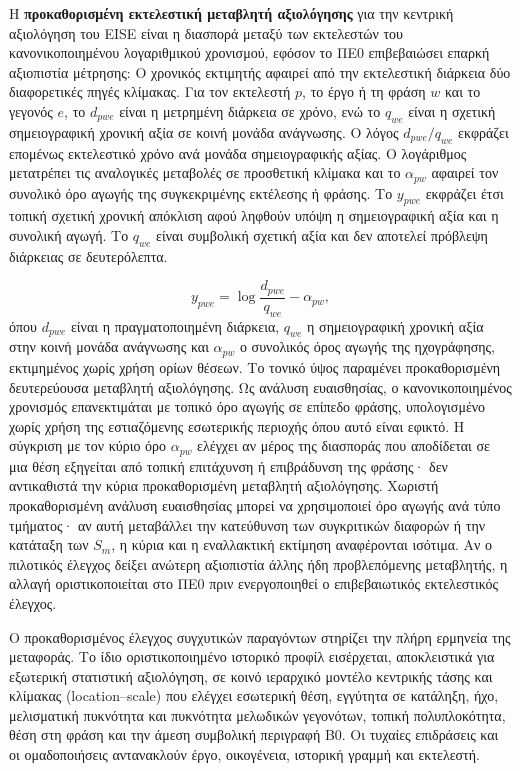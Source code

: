 \documentclass[11pt,a4paper]{article}
\begin{document}
Η \textbf{προκαθορισμένη εκτελεστική μεταβλητή αξιολόγησης} για την κεντρική αξιολόγηση του EISE είναι η διασπορά μεταξύ των εκτελεστών του κανονικοποιημένου λογαριθμικού χρονισμού, εφόσον το ΠΕ0 επιβεβαιώσει επαρκή αξιοπιστία μέτρησης:
Ο χρονικός εκτιμητής αφαιρεί από την εκτελεστική διάρκεια δύο διαφορετικές πηγές κλίμακας. Για τον εκτελεστή $p$, το έργο ή τη φράση $w$ και το γεγονός $e$, το $d_{pwe}$ είναι η μετρημένη διάρκεια σε χρόνο, ενώ το $q_{we}$ είναι η σχετική σημειογραφική χρονική αξία σε κοινή μονάδα ανάγνωσης. Ο λόγος $d_{pwe}/q_{we}$ εκφράζει επομένως εκτελεστικό χρόνο ανά μονάδα σημειογραφικής αξίας. Ο λογάριθμος μετατρέπει τις αναλογικές μεταβολές σε προσθετική κλίμακα και το $\alpha_{pw}$ αφαιρεί τον συνολικό όρο αγωγής της συγκεκριμένης εκτέλεσης ή φράσης. Το $y_{pwe}$ εκφράζει έτσι τοπική σχετική χρονική απόκλιση αφού ληφθούν υπόψη η σημειογραφική αξία και η συνολική αγωγή. Το $q_{we}$ είναι συμβολική σχετική αξία και δεν αποτελεί πρόβλεψη διάρκειας σε δευτερόλεπτα.

\[
y_{pwe}=\log\!\frac{d_{pwe}}{q_{we}}-\alpha_{pw},
\]
όπου $d_{pwe}$ είναι η πραγματοποιημένη διάρκεια, $q_{we}$ η σημειογραφική χρονική αξία στην κοινή μονάδα ανάγνωσης και $\alpha_{pw}$ ο συνολικός όρος αγωγής της ηχογράφησης, εκτιμημένος χωρίς χρήση ορίων θέσεων. Το τονικό ύψος παραμένει προκαθορισμένη δευτερεύουσα μεταβλητή αξιολόγησης. Ως ανάλυση ευαισθησίας, ο κανονικοποιημένος χρονισμός επανεκτιμάται με τοπικό όρο αγωγής σε επίπεδο φράσης, υπολογισμένο χωρίς χρήση της εστιαζόμενης εσωτερικής περιοχής όπου αυτό είναι εφικτό. Η σύγκριση με τον κύριο όρο $\alpha_{pw}$ ελέγχει αν μέρος της διασποράς που αποδίδεται σε μια θέση εξηγείται από τοπική επιτάχυνση ή επιβράδυνση της φράσης· δεν αντικαθιστά την κύρια προκαθορισμένη μεταβλητή αξιολόγησης. Χωριστή προκαθορισμένη ανάλυση ευαισθησίας μπορεί να χρησιμοποιεί όρο αγωγής ανά τύπο τμήματος· αν αυτή μεταβάλλει την κατεύθυνση των συγκριτικών διαφορών ή την κατάταξη των $S_m$, η κύρια και η εναλλακτική εκτίμηση αναφέρονται ισότιμα. Αν ο πιλοτικός έλεγχος δείξει ανώτερη αξιοπιστία άλλης ήδη προβλεπόμενης μεταβλητής, η αλλαγή οριστικοποιείται στο ΠΕ0 πριν ενεργοποιηθεί ο επιβεβαιωτικός εκτελεστικός έλεγχος.

Ο προκαθορισμένος έλεγχος συγχυτικών παραγόντων στηρίζει την πλήρη ερμηνεία της μεταφοράς. Το ίδιο οριστικοποιημένο ιστορικό προφίλ εισέρχεται, αποκλειστικά για εξωτερική στατιστική αξιολόγηση, σε κοινό ιεραρχικό μοντέλο κεντρικής τάσης και κλίμακας (location--scale) που ελέγχει εσωτερική θέση, εγγύτητα σε κατάληξη, ήχο, μελισματική πυκνότητα και πυκνότητα μελωδικών γεγονότων, τοπική πολυπλοκότητα, θέση στη φράση και την άμεση συμβολική περιγραφή B0. Οι τυχαίες επιδράσεις και οι ομαδοποιήσεις αντανακλούν έργο, οικογένεια, ιστορική γραμμή και εκτελεστή.
\end{document}
